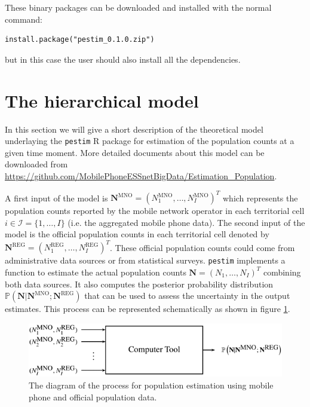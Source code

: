 \documentclass[12pt, a4paper]{article}
\begin{document}
These binary packages can be downloaded and installed with the normal command:
\begin{verbatim}
install.package("pestim_0.1.0.zip")
\end{verbatim}
but in this case the user should also install all the dependencies.

\section{The hierarchical model}\label{model}

In this section we will give a short description of the theoretical model 
underlaying the \texttt{pestim} R package for estimation of the population 
counts at a given time moment. More detailed documents about this model can be downloaded from 
\url{https://github.com/MobilePhoneESSnetBigData/Estimation_Population}.

A first input of the model is 
$\mathbf{N}^{\textrm{MNO}}=(N_{1}^{\textrm{MNO}}, \dots, N_{I}^{\textrm{MNO}})^{T}$ which 
represents the population counts reported by the mobile network operator in 
each territorial cell $i\in\mathcal{I}=\{1,\dots,I\}$ (i.e. the aggregated mobile phone data). 
The second input of the model is the official population counts in each territorial cell denoted by 
$\mathbf{N}^{\textrm{REG}}=(N_{1}^{\textrm{REG}}, \dots, N_{I}^{\textrm{REG}})^{T}$. 
These official population counts could come from administrative data sources or from statistical surveys.
\texttt{pestim} implements a function to estimate the actual population 
counts $\mathbf{N}=(N_{1}, \dots, N_{I})^{T}$ combining both data sources. 
It also computes the posterior probability distribution 
$\mathbb{P}\left(\mathbf{N}|\mathbf{N}^{\textrm{MNO}};\mathbf{N}^{\textrm{REG}}\right)$ 
that can be used to assess the uncertainty in the output estimates.
This process can be represented schematically as shown in figure \ref{Tool}.


\begin{figure}[htbp]
\centering
\includegraphics[scale=0.75]{Tool.png}
\caption{The diagram of the process for population estimation using mobile phone and official population data.}
\label{Tool} 
\end{figure}
\end{document}
